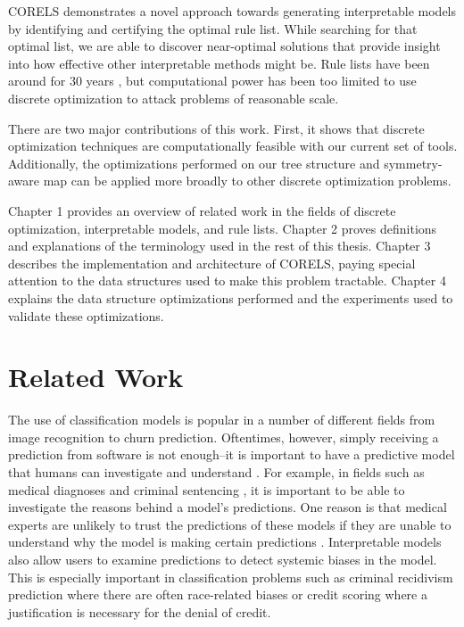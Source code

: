 \documentclass[]{report}
\theoremstyle{definition}
\begin{document}
CORELS demonstrates a novel approach towards generating interpretable models by identifying and certifying the optimal rule list. 
While searching for that optimal list, we are able to discover near-optimal solutions that provide insight into how effective other interpretable methods might be. 
Rule lists have been around for 30 years \cite{Rivest87}, but computational power has been too limited to use discrete optimization to attack problems of reasonable scale.

There are two major contributions of this work.
First, it shows that discrete optimization techniques are computationally feasible with our current set of tools.
Additionally, the optimizations performed on our tree structure and symmetry-aware map can be applied more broadly to other discrete optimization problems.

Chapter 1 provides an overview of related work in the fields of discrete optimization, interpretable models, and rule lists. 
Chapter 2 proves definitions and explanations of the terminology used in the rest of this thesis.
Chapter 3 describes the implementation and architecture of CORELS, paying special attention to the data structures used to make this problem tractable.
Chapter 4 explains the data structure optimizations performed and the experiments used to validate these optimizations.

\chapter{Related Work}

The use of classification models is popular in a number of different fields from image recognition to churn prediction.
Oftentimes, however, simply receiving a prediction from software is not enough--it is important to have a predictive model that humans can investigate and understand \cite{Ruping06, Bratko97, Quinlan99, Martens11, Freitas14}.
For example, in fields such as medical diagnoses \cite{BellazziZu08} and criminal sentencing \cite{LarsonMaKiAn16}, it is important to be able to investigate the reasons behind a model's predictions.
One reason is that medical experts are unlikely to trust the predictions of these models if they are unable to understand why the model is making certain predictions \cite{Lavrač99}.
Interpretable models also allow users to examine predictions to detect systemic biases in the model.
This is especially important in classification problems such as criminal recidivism prediction where there are often race-related biases\cite{LarsonMaKiAn16} or credit scoring where a justification is necessary for the denial of credit\cite{BaesensMuDeVaSe05}.
\end{document}
